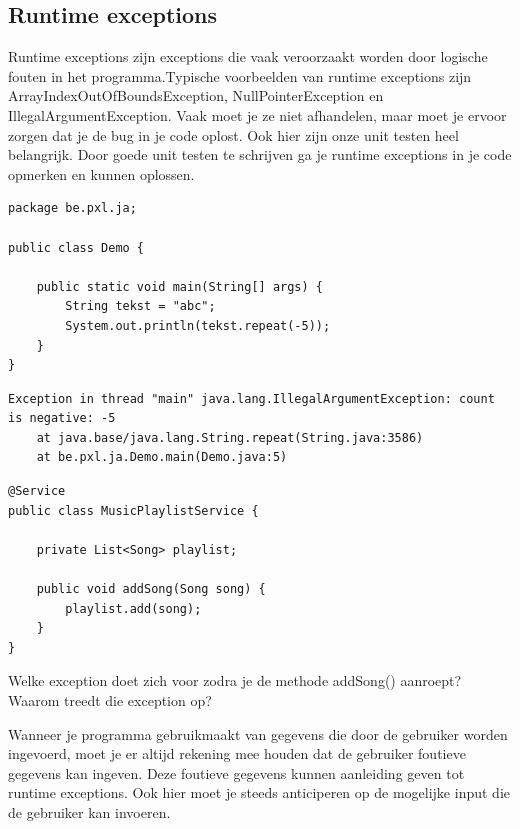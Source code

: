 \subsection{Runtime exceptions}

Runtime exceptions zijn exceptions die vaak veroorzaakt worden door logische fouten in het programma.Typische voorbeelden van runtime exceptions zijn ArrayIndexOutOfBoundsException, NullPointerException en IllegalArgumentException. Vaak moet je ze niet afhandelen, maar moet je ervoor zorgen dat je de bug in je code oplost. Ook hier zijn onze unit testen heel belangrijk. Door goede unit testen te schrijven ga je runtime exceptions in je code opmerken en kunnen oplossen.

\begin{lstlisting}
package be.pxl.ja;

public class Demo {

	public static void main(String[] args) {
		String tekst = "abc";
		System.out.println(tekst.repeat(-5));
	}
}
\end{lstlisting}

\begin{verbatim}
Exception in thread "main" java.lang.IllegalArgumentException: count is negative: -5
	at java.base/java.lang.String.repeat(String.java:3586)
	at be.pxl.ja.Demo.main(Demo.java:5)
\end{verbatim}

\begin{oefening}

\begin{lstlisting}
@Service
public class MusicPlaylistService {

	private List<Song> playlist;

	public void addSong(Song song) {
		playlist.add(song);
	}
}
\end{lstlisting}

Welke exception doet zich voor zodra je de methode addSong() aanroept? Waarom treedt die exception op?
\end{oefening}

Wanneer je programma gebruikmaakt van gegevens die door de gebruiker worden ingevoerd, moet je er altijd rekening mee houden dat de gebruiker foutieve gegevens kan ingeven. Deze foutieve gegevens kunnen aanleiding geven tot runtime exceptions. Ook hier moet je steeds anticiperen op de mogelijke input die de gebruiker kan invoeren. 


